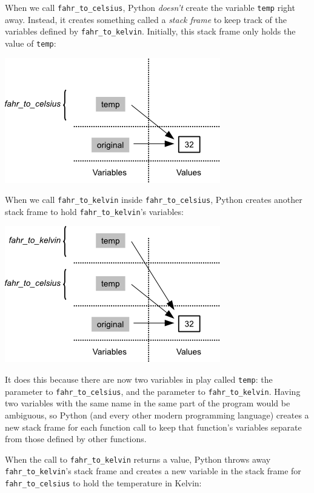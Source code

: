 \documentclass[]{book}
\newcommand{\gdef}[2]{\emph{#2}}
\begin{document}
When we call \texttt{fahr\_to\_celsius}, Python \emph{doesn't} create
the variable \texttt{temp} right away. Instead, it creates something
called a \gdef{g:stack-frame}{stack frame} to keep track of the
variables defined by \texttt{fahr\_to\_kelvin}. Initially, this stack
frame only holds the value of \texttt{temp}:

\includegraphics{novice/python/img/python-call-stack-02.png}

When we call \texttt{fahr\_to\_kelvin} inside
\texttt{fahr\_to\_celsius}, Python creates another stack frame to hold
\texttt{fahr\_to\_kelvin}'s variables:

\includegraphics{novice/python/img/python-call-stack-03.png}

It does this because there are now two variables in play called
\texttt{temp}: the parameter to \texttt{fahr\_to\_celsius}, and the
parameter to \texttt{fahr\_to\_kelvin}. Having two variables with the
same name in the same part of the program would be ambiguous, so Python
(and every other modern programming language) creates a new stack frame
for each function call to keep that function's variables separate from
those defined by other functions.

When the call to \texttt{fahr\_to\_kelvin} returns a value, Python
throws away \texttt{fahr\_to\_kelvin}'s stack frame and creates a new
variable in the stack frame for \texttt{fahr\_to\_celsius} to hold the
temperature in Kelvin:
\end{document}

